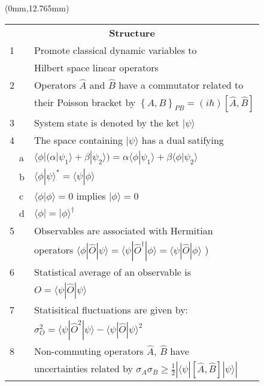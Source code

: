 \begin{textblock*}{74mm}(0mm,12.765mm)
\begin{tabular*}{74mm}{l @{\extracolsep{\fill}} l}
\multicolumn{2}{c}{\bf Structure} \\
1  & Promote classical dynamic variables to\\
   & Hilbert space linear operators \hfill\\
2  & Operators $\hat A$ and $\hat B$ have a commutator related to \\
   & their Poisson bracket by $\left\{ A, B \right\}_{PB} = \left( i \hbar \right) \left[ \hat A, \hat B \right]$\\
3  & System state is denoted by the ket $| \psi \rangle$ \\
4  & The space containing $| \psi \rangle$ has a dual satifying\\
~~a& $ \langle \phi | \big( \alpha | \psi_1 \rangle + \beta | \psi_2 \rangle \big) 
     = \alpha \langle \phi | \psi_1 \rangle + \beta \langle \phi | \psi_2 \rangle$ \\
~~b& $\langle \phi | \psi \rangle ^* = \langle \psi | \phi \rangle$ \\
~~c& $\langle \phi | \phi \rangle = 0$ implies $| \phi \rangle = 0$ \\
~~d& $\langle \phi | = | \phi \rangle ^{\dagger}$ \\
5  & Observables are associated with Hermitian \\
   & operators $\langle \phi | \hat O | \psi \rangle
        = \langle \psi | \hat O ^ \dagger | \phi \rangle 
        = \langle \psi | \hat O | \phi \rangle$ )\\
6  & Statistical average of an observable is \\
   &$O = \langle \psi | \hat O | \psi \rangle$\\
7  & Statisitical fluctuations are given by:\\
   &$\sigma_{O}^2 = \langle \psi | \hat O ^2 | \psi \rangle 
     - \langle \psi | \hat O | \psi \rangle ^2$ \\
8  &Non-commuting operators $\hat A$, $\hat B$ have\\
   &uncertainties related by $ \sigma_A \sigma_B 
    \ge \frac{1}{2} \left| \langle \psi | [ \hat A , \hat B ] | \psi \rangle \right|$\\
\end{tabular*}
\end{textblock*}

